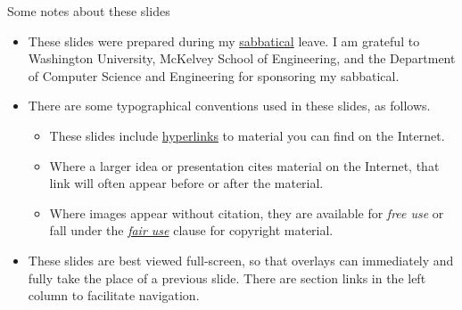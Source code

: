 \begin{frame}{Some notes about these slides}
\begin{itemize}[<+->]
    \item These slides were prepared during my \href{https://en.wikipedia.org/wiki/Sabbatical}{sabbatical} leave.  I am grateful to Washington University, McKelvey School of Engineering, and the Department of Computer Science and Engineering for sponsoring my sabbatical.
    \item There are some typographical conventions used in these slides, as follows.
    \begin{itemize}
        \item These slides include \href{https://en.wikipedia.org/wiki/Hyperlink}{hyperlinks} to material you can find on the Internet.
        \item Where a larger idea or presentation cites material on the Internet, that link will often appear before or after the material. 
        \item Where images appear without citation, they are available for \emph{free use} or fall under the \href{https://en.wikipedia.org/wiki/Fair_use}{\emph{fair use}} clause for copyright material. 
    \end{itemize}
    \item These slides are best viewed full-screen, so that overlays can immediately and fully take the place of a previous slide.  There are section links in the left column to facilitate navigation.
\end{itemize}
\end{frame}

